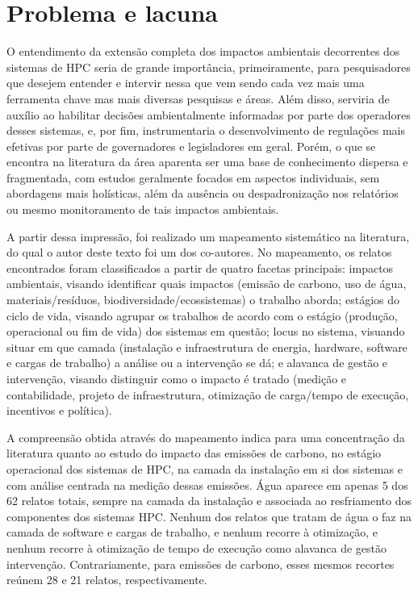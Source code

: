 \section{Problema e lacuna}

O entendimento da extensão completa dos impactos ambientais decorrentes
dos sistemas de HPC seria de grande importância, primeiramente, para pesquisadores  
que desejem entender e intervir nessa que vem sendo cada vez mais uma ferramenta chave mas mais
diversas pesquisas e áreas. Além disso, serviria de auxílio ao habilitar decisões ambientalmente
informadas por parte dos operadores desses sistemas, e, por fim, instrumentaria o desenvolvimento
de regulações mais efetivas por parte de governadores e legisladores em geral. Porém, o que se encontra 
na literatura da área aparenta ser uma base de conhecimento dispersa e fragmentada, com estudos 
geralmente focados em aspectos individuais, sem abordagens mais holísticas, além da ausência ou despadronização
nos relatórios ou mesmo monitoramento de tais impactos ambientais. 

A partir dessa impressão, foi realizado um mapeamento sistemático na literatura, do qual o autor
deste texto foi um dos co-autores. No mapeamento, os relatos encontrados foram classificados a partir de quatro
facetas principais: impactos ambientais, visando identificar quais impactos (emissão de 
carbono, uso de água, materiais/resíduos, biodiversidade/ecossistemas) o trabalho aborda; estágios 
do ciclo de vida, visando agrupar os trabalhos de acordo com o estágio (produção, operacional ou fim de vida)
dos sistemas em questão; locus no sistema, visuando situar em que camada (instalação e 
infraestrutura de energia, hardware, software e cargas de trabalho) a análise ou a intervenção se dá;
e alavanca de gestão e intervenção, visando distinguir como o impacto é tratado (medição e contabilidade,
projeto de infraestrutura, otimização de carga/tempo de execução, incentivos e política).

A compreensão obtida através do mapeamento indica para uma concentração da literatura quanto ao estudo
do impacto das emissões de carbono, no estágio operacional dos sistemas de HPC, na camada da instalação
em si dos sistemas e com análise centrada na medição dessas emissões. Água aparece em apenas 5 dos 
62 relatos totais, sempre na camada da instalação e associada ao resfriamento dos componentes dos sistemas
HPC. Nenhum dos relatos que tratam de água o faz na camada de software e cargas de trabalho, e nenhum 
recorre à otimização, e nenhum recorre à otimização de tempo de execução como alavanca de gestão intervenção.
Contrariamente, para emissões de carbono, esses mesmos recortes reúnem 28 e 21 relatos, respectivamente.

